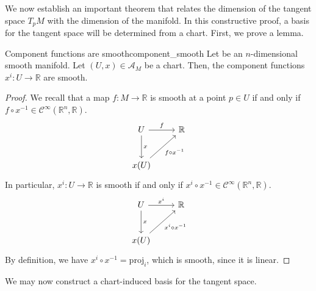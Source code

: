 We now establish an important theorem that relates the dimension of the tangent space \(T_pM\) with the dimension of the manifold. In this constructive proof, a basis for the tangent space will be determined from a chart. First, we prove a lemma.

\begin{lemma}{Component functions are smooth}{component_smooth}
    Let  be an \(n\)-dimensional smooth manifold. Let \((U, x) \in \mathscr{A}_M\) be a chart. Then, the component functions \(x^i : U \to \mathbb{R}\) are smooth.
\end{lemma}
\begin{proof}
    We recall that a map \(f : M \to \mathbb{R}\) is smooth at a point \(p \in U\) if and only if \(f \circ x^{-1} \in \mathcal{C}^\infty (\mathbb{R}^n, \mathbb{R})\).
    \begin{equation*}
        \begin{tikzcd}[column sep = normal, row sep = large]
            U \arrow{r}{f} \arrow{d}{x} & \mathbb{R}\\
            x(U) \arrow[swap]{ur}{f \circ x^{-1}} &
        \end{tikzcd}
    \end{equation*}
    In particular, \(x^i : U \to \mathbb{R}\) is smooth if and only if \(x^i \circ x^{-1} \in \mathcal{C}^\infty(\mathbb{R}^n, \mathbb{R}).\)
    \begin{equation*}
        \begin{tikzcd}[column sep = normal, row sep = large]
            U \arrow{r}{x^i} \arrow{d}{x} & \mathbb{R}\\
            x(U) \arrow[swap]{ur}{x^i \circ x^{-1}} &
        \end{tikzcd}
    \end{equation*}
    By definition, we have \(x^i \circ x^{-1} = \mathrm{proj}_i\), which is smooth, since it is linear.
\end{proof}

We may now construct a chart-induced basis for the tangent space.

